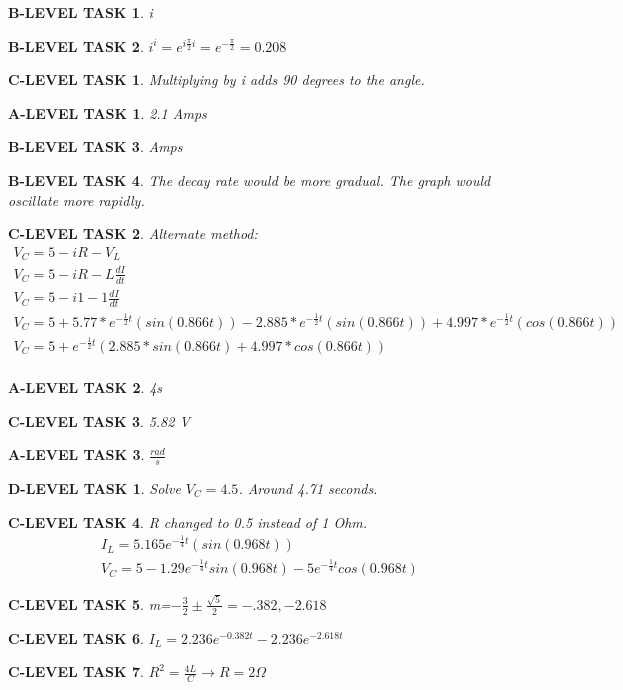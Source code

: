 \documentclass{book}
\numberwithin{equation}{section}
\newtheorem{alevel}{A-LEVEL TASK}
\newtheorem{blevel}{B-LEVEL TASK}
\newtheorem{clevel}{C-LEVEL TASK}
\newtheorem{dlevel}{D-LEVEL TASK}
\theoremstyle{definition}
\begin{document}
\begin{blevel}i\end{blevel}
\begin{blevel}$i^i=e^{i\frac{\pi}{2}i}=e^{-\frac{\pi}{2}}=0.208$\end{blevel}
\begin{clevel}Multiplying by i adds 90 degrees to the angle.\end{clevel}
\begin{alevel}2.1 Amps\end{alevel}
\begin{blevel}Amps\end{blevel}
\begin{blevel}The decay rate would be more gradual. The graph would oscillate more rapidly.\end{blevel}
\begin{clevel} Alternate method:
\begin{align*}
V_C=5-iR-V_L\\
V_C=5-iR-L\frac{dI}{dt}\\
V_C=5-i1-1\frac{dI}{dt}\\
V_C=5+5.77*e^{-\frac{1}{2} t}(sin(0.866 t))-2.885*e^{-\frac{1}{2} t}(sin(0.866 t))+
4.997*e^{-\frac{1}{2} t}(cos(0.866 t))\\
V_C=5+e^{-\frac{1}{2} t}(2.885*sin(0.866 t)+4.997*cos(0.866 t))\\
\end{align*}
\end{clevel}

\begin{alevel}4s\end{alevel}
\begin{clevel}5.82 V \end{clevel}
\begin{alevel}$\frac{rad}{s}$\end{alevel}
\begin{dlevel}Solve $V_C=4.5$. Around 4.71 seconds.\end{dlevel}
\begin{clevel} R changed to 0.5 instead of 1 Ohm.
\begin{align*}
I_L=5.165e^{-\frac{1}{4} t}(sin(0.968 t))\\
V_C=5-1.29e^{-\frac{1}{4}t}sin(0.968 t)-5e^{-\frac{1}{4}t}cos(0.968 t)
\end{align*}
\end{clevel}
\begin{clevel}m=$-\frac{3}{2} \pm \frac{\sqrt{5}}{2}=-.382,-2.618$\end{clevel}
\begin{clevel}$I_L=2.236e^{-0.382 t}-2.236e^{-2.618 t}$\end{clevel}
\begin{clevel}$R^2=\frac{4L}{C} \rightarrow R=2\Omega$\end{clevel}
\end{document}
